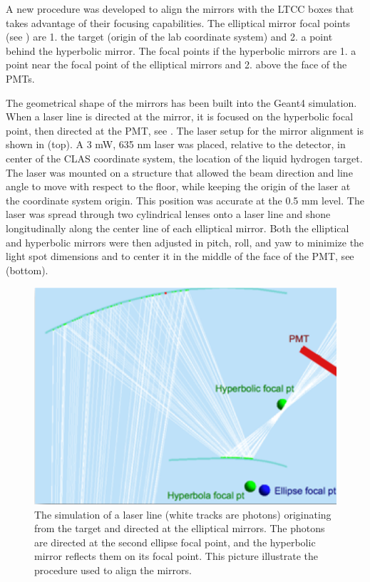 A new procedure was developed to align the mirrors with the LTCC boxes that takes advantage of their focusing capabilities.
The elliptical mirror focal points (see ) are 1. the target (origin of the lab coordinate system)
and 2. a point behind the hyperbolic mirror. The focal points if the hyperbolic mirrors are 1. a point near the focal point of the elliptical mirrors and
2. above the face of the PMTs.

The geometrical shape of the mirrors has been built into the Geant4 simulation. When a laser line is directed at the mirror,
it is focused on the hyperbolic focal point, then directed at the PMT, see .
The laser setup for the mirror alignment is shown in  (top). A 3 mW, 635 nm laser was placed, relative to the detector,
in center of the CLAS coordinate system, the location of the liquid hydrogen target.
The laser was mounted on a structure that allowed the beam direction and line angle to move with respect to the floor, while keeping
the origin of the laser at the coordinate system origin.
This position was accurate at the 0.5 mm level. The laser was spread through two cylindrical lenses onto a laser line and shone
longitudinally along the center line of each elliptical mirror. Both the elliptical and hyperbolic mirrors were then adjusted in pitch, roll, and yaw to minimize the light spot
dimensions and to center it in the middle of the face of the PMT, see   (bottom).


\begin{figure}[h]
\centering
	\includegraphics[width=0.95\columnwidth, keepaspectratio]{img/mirrorAlignmentSimulationZoomed.png}
	\caption{The simulation of a laser line (white tracks are photons) originating from the target and directed at the elliptical mirrors. The photons are directed
		      at the second ellipse focal point, and the hyperbolic mirror reflects them on its focal point. This picture illustrate the procedure used to align the mirrors.}
	\label{fig:alignmentSimulation}
\end{figure}


